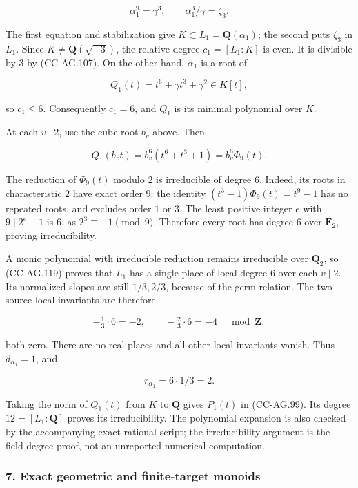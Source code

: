 \[
 \alpha_1^9=\gamma^3,\qquad
 \alpha_1^3/\gamma=\zeta_3.
 \tag{CC-AG.117}
\]

The first equation and stabilization give
\(K\subset L_1=\mathbf Q(\alpha_1)\); the second puts \(\zeta_3\) in
\(L_1\). Since \(K\ne\mathbf Q(\sqrt{-3})\), the relative degree
\(c_1=[L_1:K]\) is even. It is divisible by \(3\) by (CC-AG.107). On the
other hand, \(\alpha_1\) is a root of

\[
 Q_1(t)=t^6+\gamma t^3+\gamma^2\in K[t],
 \tag{CC-AG.118}
\]

so \(c_1\le6\). Consequently \(c_1=6\), and \(Q_1\) is its minimal
polynomial over \(K\).

At each \(v\mid2\), use the cube root \(b_v\) above. Then

\[
 Q_1(b_vt)=b_v^6(t^6+t^3+1)=b_v^6\Phi_9(t).
 \tag{CC-AG.119}
\]

The reduction of \(\Phi_9(t)\) modulo \(2\) is irreducible of degree
\(6\). Indeed, its roots in characteristic \(2\) have exact order \(9\):
the identity \((t^3-1)\Phi_9(t)=t^9-1\) has no repeated roots, and
excludes order \(1\) or \(3\). The least positive integer \(e\) with
\(9\mid2^e-1\) is \(6\), as \(2^3\equiv-1\pmod9\). Therefore every root
has degree \(6\) over \(\mathbf F_2\), proving irreducibility.

A monic polynomial with irreducible reduction remains irreducible over
\(\mathbf Q_2\), so (CC-AG.119) proves that \(L_1\) has a single place
of local degree \(6\) over each \(v\mid2\). Its normalized slopes are
still \(1/3,2/3\), because of the germ relation. The two source local
invariants are therefore

\[
 -\tfrac13\cdot6=-2,\qquad
 -\tfrac23\cdot6=-4
 \quad\bmod\mathbf Z,
\]

both zero. There are no real places and all other local invariants
vanish. Thus \(d_{\alpha_1}=1\), and

\[
 r_{\alpha_1}=6\cdot1/3=2.
 \tag{CC-AG.120}
\]

Taking the norm of \(Q_1(t)\) from \(K\) to \(\mathbf Q\) gives
\(P_1(t)\) in (CC-AG.99). Its degree \(12=[L_1:\mathbf Q]\) proves its
irreducibility. The polynomial expansion is also checked by the
accompanying exact rational script; the irreducibility argument is the
field-degree proof, not an unreported numerical computation.

\subsubsection{7. Exact geometric and finite-target
monoids}\label{exact-geometric-and-finite-target-monoids}


